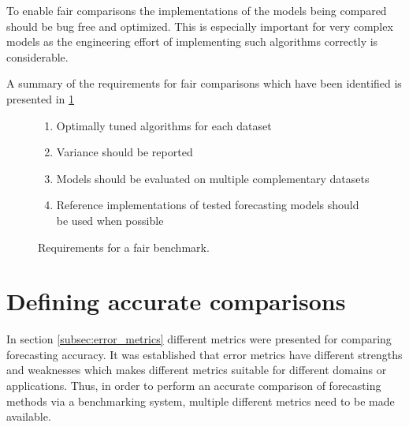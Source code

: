 To enable fair comparisons the implementations of the models being compared should be bug free and optimized. This is especially important for very complex models as the engineering effort of implementing such algorithms correctly is considerable.

A summary of the requirements for fair comparisons which have been identified is presented in \ref{fig:fair_requirements}
\begin{figure}[h]
  \begin{enumerate}
    \item Optimally tuned algorithms for each dataset
    \item Variance should be reported
    \item Models should be evaluated on multiple complementary datasets
    \item Reference implementations of tested forecasting models should be used when possible
  \end{enumerate}
  \caption{Requirements for a fair benchmark.}
  \label{fig:fair_requirements}
\end{figure}

\section{Defining accurate comparisons}
In section \ref{subsec:error_metrics} different metrics were presented for comparing forecasting accuracy. It was established that error metrics have different strengths and weaknesses which makes different metrics suitable for different domains or applications.
Thus, in order to perform an accurate comparison of forecasting methods via a benchmarking system, multiple different metrics need to be made available.

